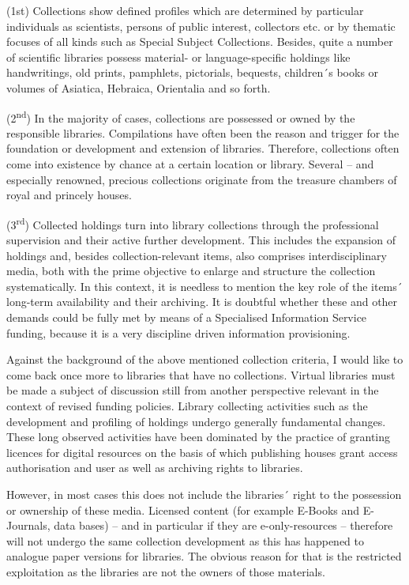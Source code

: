 \documentclass[a4paper,
fontsize=11pt,
oneside,
numbers=noperiodatend,
parskip=half-,
bibliography=totoc,
final
]{scrartcl}
\begin{document}
(1st) Collections show defined profiles which are determined by
particular individuals as scientists, persons of public interest,
collectors etc. or by thematic focuses of all kinds such as Special
Subject Collections. Besides, quite a number of scientific libraries
possess material- or language-specific holdings like handwritings, old
prints, pamphlets, pictorials, bequests, children´s books or volumes of
Asiatica, Hebraica, Orientalia and so forth.

(2\textsuperscript{nd}) In the majority of cases, collections are
possessed or owned by the responsible libraries. Compilations have often
been the reason and trigger for the foundation or development and
extension of libraries. Therefore, collections often come into existence
by chance at a certain location or library. Several -- and especially
renowned, precious collections originate from the treasure chambers of
royal and princely houses.

(3\textsuperscript{rd}) Collected holdings turn into library collections
through the professional supervision and their active further
development. This includes the expansion of holdings and, besides
collection-relevant items, also comprises interdisciplinary media, both
with the prime objective to enlarge and structure the collection
systematically. In this context, it is needless to mention the key role
of the items´ long-term availability and their archiving. It is doubtful
whether these and other demands could be fully met by means of a
Specialised Information Service funding, because it is a very discipline
driven information provisioning.

Against the background of the above mentioned collection criteria, I
would like to come back once more to libraries that have no collections.
Virtual libraries must be made a subject of discussion still from
another perspective relevant in the context of revised funding policies.
Library collecting activities such as the development and profiling of
holdings undergo generally fundamental changes. These long observed
activities have been dominated by the practice of granting licences for
digital resources on the basis of which publishing houses grant access
authorisation and user as well as archiving rights to libraries.

However, in most cases this does not include the libraries´ right to the
possession or ownership of these media. Licensed content (for example
E-Books and E-Journals, data bases) -- and in particular if they are
e-only-resources -- therefore will not undergo the same collection
development as this has happened to analogue paper versions for
libraries. The obvious reason for that is the restricted exploitation as
the libraries are not the owners of those materials.
\end{document}
